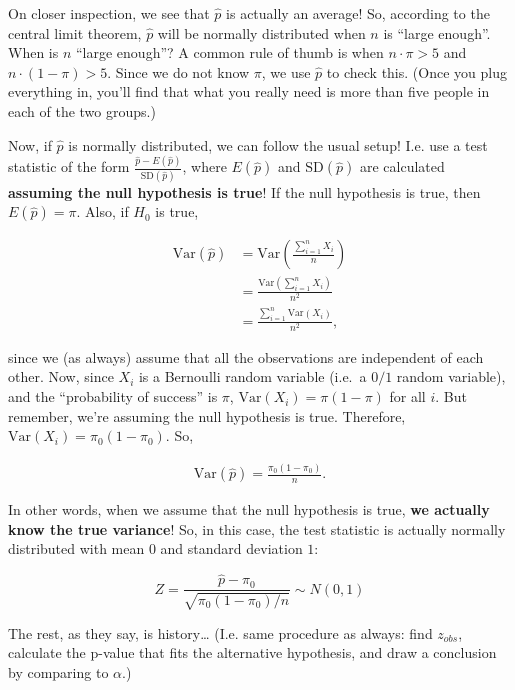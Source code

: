 \documentclass[]{book}
\theoremstyle{definition}
\theoremstyle{definition}
\theoremstyle{definition}
\theoremstyle{remark}
\begin{document}
On closer inspection, we see that \(\hat{p}\) is actually an average! So, according to the central limit theorem, \(\hat{p}\) will be normally distributed when \(n\) is ``large enough''. When is \(n\) ``large enough''? A common rule of thumb is when \(n\cdot \pi > 5\) and \(n \cdot (1-\pi) > 5\). Since we do not know \(\pi\), we use \(\hat{p}\) to check this. (Once you plug everything in, you'll find that what you really need is more than five people in each of the two groups.)

Now, if \(\hat{p}\) is normally distributed, we can follow the usual setup! I.e. use a test statistic of the form \(\frac{\hat{p} - E(\hat{p})}{\text{SD}(\hat{p})}\), where \(E(\hat{p})\) and \(\text{SD}(\hat{p})\) are calculated \textbf{assuming the null hypothesis is true}! If the null hypothesis is true, then \(E(\hat{p}) = \pi\). Also, if \(H_0\) is true,

\begin{align*}
  \text{Var}(\hat{p}) &= \text{Var}\left(\frac{\sum_{i=1}^n X_i}{n}\right) \\
                &= \frac{\text{Var}\left(\sum_{i=1}^n X_i\right)}{n^2} \\
                &= \frac{\sum_{i=1}^n \text{Var}\left( X_i\right)}{n^2},
\end{align*}

since we (as always) assume that all the observations are independent of each other. Now, since \(X_i\) is a Bernoulli random variable (i.e.~a \(0/1\) random variable), and the ``probability of success'' is \(\pi\), \(\text{Var}(X_i) = \pi(1-\pi)\) for all \(i\). But remember, we're assuming the null hypothesis is true. Therefore, \(\text{Var}(X_i) = \pi_0(1-\pi_0)\). So,

\begin{align*}
  \text{Var}(\hat{p}) = \frac{\pi_0(1-\pi_0)}{n}.
\end{align*}

In other words, when we assume that the null hypothesis is true, \textbf{we actually know the true variance}! So, in this case, the test statistic is actually normally distributed with mean \(0\) and standard deviation \(1\):

\[
  Z = \frac{\hat{p} - \pi_0}{\sqrt{\pi_0(1-\pi_0)/n}} \sim N(0,1)
\]

The rest, as they say, is history\ldots{} (I.e. same procedure as always: find \(z_{obs}\), calculate the p-value that fits the alternative hypothesis, and draw a conclusion by comparing to \(\alpha\).)
\end{document}
